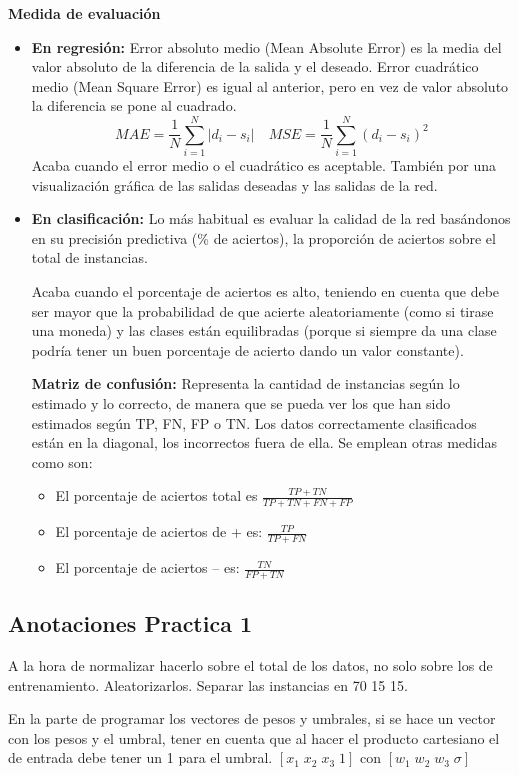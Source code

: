 \documentclass[12pt, twoside, openright]{report} %
\begin{document}
\textbf{Medida de evaluación}
\begin{itemize}
	\item \textbf{En regresión:} Error absoluto medio (Mean Absolute Error) es la media del valor absoluto de la diferencia de la salida y el deseado. Error cuadrático medio (Mean Square Error) es igual al anterior, pero en vez de valor absoluto la diferencia se pone al cuadrado.
	      $$MAE=\frac 1 N \sum^N_{i=1} |d_i-s_i| \quad MSE=\frac 1 N \sum^N_{i=1} (d_i-s_i)^2$$
	      Acaba cuando el error medio o el cuadrático es aceptable. También por una visualización gráfica de las salidas deseadas y las salidas de la red.
	\item \textbf{En clasificación:} Lo más habitual es evaluar la calidad de la red basándonos en su precisión predictiva (\% de aciertos), la proporción de aciertos sobre el total de instancias.
	      
	      Acaba cuando el porcentaje de aciertos es alto, teniendo en cuenta que debe ser mayor que la probabilidad de que acierte aleatoriamente (como si tirase una moneda) y las clases están equilibradas (porque si siempre da una clase podría tener un buen porcentaje de acierto dando un valor constante).
	      
	      \textbf{Matriz de confusión:} Representa la cantidad de instancias según lo estimado y lo correcto, de manera que se pueda ver los que han sido estimados según TP, FN, FP o TN. Los datos correctamente clasificados están en la diagonal, los incorrectos fuera de ella. Se emplean otras medidas como son:
	      \begin{itemize}
		      \item El porcentaje de aciertos total es $\frac {TP+TN} {TP+TN+FN+FP}$
		      \item El porcentaje de aciertos de + es: $\frac {TP} {TP+FN}$
		      \item El porcentaje de aciertos – es: $\frac {TN} {FP+TN}$
	      \end{itemize}
	      
\end{itemize}

\subsection{Anotaciones Practica 1}
A la hora de normalizar hacerlo sobre el total de los datos, no solo sobre los de entrenamiento.
Aleatorizarlos.
Separar las instancias en 70 15 15.

En la parte de programar los vectores de pesos y umbrales, si se hace un vector con los pesos y el umbral, tener en cuenta que al hacer el producto cartesiano el de entrada debe tener un 1 para el umbral. $[x_1 \; x_2 \; x_3 \; 1]$ con $[w_1 \; w_2 \; w_3 \; \sigma]$
\end{document}
